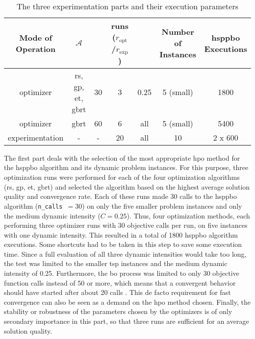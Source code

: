 \begin{table}[ht]
	 \caption{The three experimentation parts and their execution parameters}
	\label{tab:exp-setup}
	\centering
	\begin{adjustbox}{width=1\textwidth}
	\begin{tabular}{c c c c c c c}
		\hline
		\thead{Mode of\\Operation} & \thead{HPO Method} $\mathcal{A}$ & \thead{n\_calls} & \thead{runs\\ ($r_\text{opt}$/$r_\text{exp}$)} & \thead{Dynamic Intensity $C$} & \thead{Number of\\Instances} & \thead{\gls{hsppbo}\\Executions} \\
		\hline
		optimizer & \makecell{\gls{rs}, \gls{gp},\\ \gls{et}, \gls{gbrt}} & 30 & 3 & 0.25 & 5 (small) & 1800 \\

		optimizer & \gls{gbrt} & 60 & 6 & all & 5 (small) & 5400 \\
		experimentation & - & - & 20 & all & 10  & 2 x 600 \\ \hline
	\end{tabular}
\end{adjustbox}
\end{table}

The first part deals with the selection of the most appropriate \gls{hpo} method for the \gls{hsppbo} algorithm and its dynamic problem instances. For this purpose, three optimization runs were performed for each of the four optimization algorithms (\gls{rs}, \gls{gp}, \gls{et}, \gls{gbrt}) and selected the algorithm based on the highest average solution quality and convergence rate. Each of these runs made 30 calls to the \gls{hsppbo} algorithm (\texttt{n\_calls }$= 30$) on only the five smaller problem instances and only the medium dynamic intensity ($C = 0.25$). Thus, four optimization methods, each performing three optimizer runs with 30 objective calls per run, on five instances with one dynamic intensity. This resulted in a total of 1800 \gls{hsppbo} algorithm executions. Some shortcuts had to be taken in this step to save some execution time. Since a full evaluation of all three dynamic intensities would take too long, the test was limited to the smaller \gls{tsp} instances and the medium dynamic intensity of 0.25. Furthermore, the \gls{bo} process was limited to only 30 objective function calls instead of 50 or more, which means that a convergent behavior should have started after about 20 calls \cite{head2016}. This de facto requirement for fast convergence can also be seen as a demand on the \gls{hpo} method chosen. Finally, the stability or robustness of the parameters chosen by the optimizers is of only secondary importance in this part, so that three runs are sufficient for an average solution quality.

